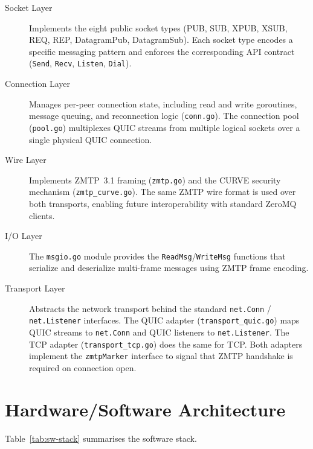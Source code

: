 \documentclass[12pt, a4paper, oneside]{report}
\begin{document}
\begin{description}
  \item[Socket Layer] Implements the eight public socket types (PUB, SUB, XPUB, XSUB, REQ, REP, DatagramPub, DatagramSub). Each socket type encodes a specific messaging pattern and enforces the corresponding API contract (\texttt{Send}, \texttt{Recv}, \texttt{Listen}, \texttt{Dial}).

  \item[Connection Layer] Manages per-peer connection state, including read and write goroutines, message queuing, and reconnection logic (\texttt{conn.go}). The connection pool (\texttt{pool.go}) multiplexes QUIC streams from multiple logical sockets over a single physical QUIC connection.

  \item[Wire Layer] Implements ZMTP~3.1 framing (\texttt{zmtp.go}) and the CURVE security mechanism (\texttt{zmtp\_curve.go}). The same ZMTP wire format is used over both transports, enabling future interoperability with standard ZeroMQ clients.

  \item[I/O Layer] The \texttt{msgio.go} module provides the \texttt{ReadMsg}/\texttt{WriteMsg} functions that serialize and deserialize multi-frame messages using ZMTP frame encoding.

  \item[Transport Layer] Abstracts the network transport behind the standard \texttt{net.Conn} / \texttt{net.Listener} interfaces. The QUIC adapter (\texttt{transport\_quic.go}) maps QUIC streams to \texttt{net.Conn} and QUIC listeners to \texttt{net.Listener}. The TCP adapter (\texttt{transport\_tcp.go}) does the same for TCP. Both adapters implement the \texttt{zmtpMarker} interface to signal that ZMTP handshake is required on connection open.
\end{description}

\section{Hardware/Software Architecture}
\label{sec:hw-sw}

Table~\ref{tab:sw-stack} summarises the software stack.
\end{document}
